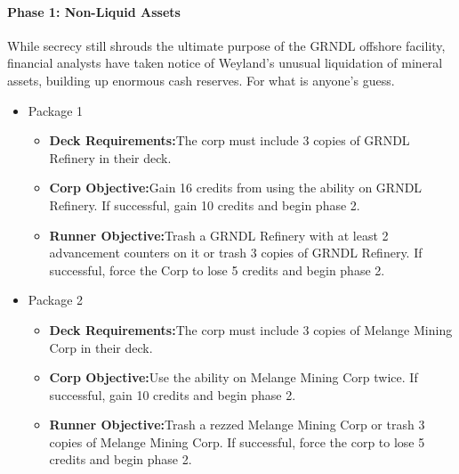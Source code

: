 \documentclass[titlepage]{article}
\begin{document}
			\paragraph{Phase 1: Non-Liquid Assets}

				While secrecy still shrouds the ultimate purpose of the GRNDL offshore facility, financial analysts have taken notice of Weyland's unusual liquidation of mineral assets, building up enormous cash reserves. For what is anyone's guess.

				\begin{itemize}

					\item Package 1

						\begin{itemize}

							\item \textbf{Deck Requirements:}The corp must include 3 copies of GRNDL Refinery in their deck.

							\item \textbf{Corp Objective:}Gain 16 credits from using the ability on GRNDL Refinery. If successful, gain 10 credits and begin phase 2.

							\item \textbf{Runner Objective:}Trash a GRNDL Refinery with at least 2 advancement counters on it or trash 3 copies of GRNDL Refinery. If successful, force the Corp to lose 5 credits and begin phase 2.

						\end{itemize}

					\item Package 2

							\begin{itemize}

								\item \textbf{Deck Requirements:}The corp must include 3 copies of Melange Mining Corp in their deck.

								\item \textbf{Corp Objective:}Use the ability on Melange Mining Corp twice. If successful, gain 10 credits and begin phase 2.

								\item \textbf{Runner Objective:}Trash a rezzed Melange Mining Corp or trash 3 copies of Melange Mining Corp. If successful, force the corp to lose 5 credits and begin phase 2.

						\end{itemize}

				\end{itemize}
\end{document}
